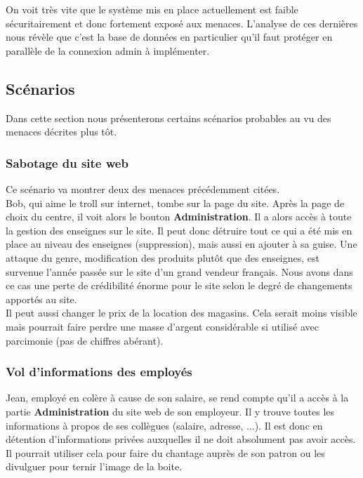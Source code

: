 \documentclass[a4paper]{article}
\begin{document}
On voit très vite que le système mis en place actuellement est faible sécuritairement et donc fortement exposé aux menaces. L'analyse de ces dernières nous révèle que c'est la base de données en particulier qu'il faut protéger en parallèle de la connexion admin à implémenter.

\subsection{Scénarios}
Dans cette section nous présenterons certains scénarios probables au vu des menaces décrites plus tôt.

\subsubsection{Sabotage du site web}
Ce scénario va montrer deux des menaces précédemment citées.\\
Bob, qui aime le troll sur internet, tombe sur la page du site. Après la page de choix du centre, il voit alors le bouton \textbf{Administration}. Il a alors accès à toute la gestion des enseignes sur le site. Il peut donc détruire tout ce qui a été mis en place au niveau des enseignes (suppression), mais aussi en ajouter à sa guise. Une attaque du genre, modification des produits plutôt que des enseignes, est survenue l'année passée sur le site d'un grand vendeur français. Nous avons dans ce cas une perte de crédibilité énorme pour le site selon le degré de changements apportés au site.\\
Il peut aussi changer le prix de la location des magasins. Cela serait moins visible mais pourrait faire perdre une masse d'argent considérable si utilisé avec parcimonie (pas de chiffres abérant).

\subsubsection{Vol d'informations des employés}
Jean, employé en colère à cause de son salaire, se rend compte qu'il a accès à la partie \textbf{Administration} du site web de son employeur. Il y trouve toutes les informations à propos de ses collègues (salaire, adresse, ...). Il est donc en détention d'informations privées auxquelles il ne doit absolument pas avoir accès. Il pourrait utiliser cela pour faire du chantage auprès de son patron ou les divulguer pour ternir l'image de la boite.
\end{document}
